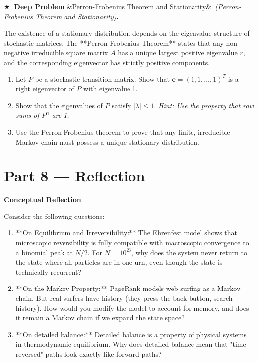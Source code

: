 \documentclass[12pt, a4paper]{article}
\newcounter{problem}
\newcounter{deepproblem}
\newenvironment{deepproblem}[1][]{%
  \refstepcounter{deepproblem}%
  \par\vspace{6pt}%
  \noindent\textbf{\color{NavyBlue}$\bigstar$\ Deep Problem \thedeepproblem}%
  \ifx&#1&\else\ \textit{(#1)}\fi\textbf{.}\enskip
}{\par\vspace{4pt}}
\begin{document}
\begin{deepproblem}[Perron-Frobenius Theorem and Stationarity]
The existence of a stationary distribution depends on the eigenvalue structure of stochastic matrices.
The **Perron-Frobenius Theorem** states that any non-negative irreducible square matrix $A$ has a unique largest positive eigenvalue $r$, and the corresponding eigenvector has strictly positive components.
\begin{enumerate}[label=(\alph*)]
  \item Let $P$ be a stochastic transition matrix. Show that $\mathbf{e} = (1, 1, \dots, 1)^T$ is a right eigenvector of $P$ with eigenvalue 1.
  \item Show that the eigenvalues of $P$ satisfy $|\lambda| \le 1$. \textit{Hint: Use the property that row sums of $P^n$ are 1.}
  \item Use the Perron-Frobenius theorem to prove that any finite, irreducible Markov chain must possess a unique stationary distribution.
\end{enumerate}
\end{deepproblem}

\newpage

\section{Part 8 \texorpdfstring{---}{--} Reflection}

\begin{reflectionbox}
\textbf{Conceptual Reflection}

Consider the following questions:
\begin{enumerate}
  \item **On Equilibrium and Irreversibility:** The Ehrenfest model shows that microscopic reversibility is fully compatible with macroscopic convergence to a binomial peak at $N/2$. For $N=10^{23}$, why does the system never return to the state where all particles are in one urn, even though the state is technically recurrent?
  \item **On the Markov Property:** PageRank models web surfing as a Markov chain. But real surfers have history (they press the back button, search history). How would you modify the model to account for memory, and does it remain a Markov chain if we expand the state space?
  \item **On detailed balance:** Detailed balance is a property of physical systems in thermodynamic equilibrium. Why does detailed balance mean that "time-reversed" paths look exactly like forward paths?
\end{enumerate}
\end{reflectionbox}
\end{document}
